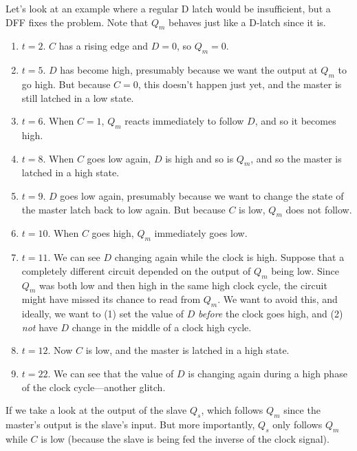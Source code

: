   \begin{example}
    \label{ex:waveforms-of-dff}
    Let's look at an example where a regular D latch would be insufficient, but a DFF fixes the problem. Note that $Q_m$ behaves just like a D-latch since it is.
    \begin{enumerate}
      \item $t = 2$. $C$ has a rising edge and $D = 0$, so $Q_m = 0$. 
      \item $t = 5$. $D$ has become high, presumably because we want the output at $Q_m$ to go high. But because $C = 0$, this doesn't happen just yet, and the master is still latched in a low state. 
      \item $t = 6$. When $C = 1$, $Q_m$ reacts immediately to follow $D$, and so it becomes high. 
      \item $t = 8$. When $C$ goes low again, $D$ is high and so is $Q_m$, and so the master is latched in a high state. 
      \item $t = 9$. $D$ goes low again, presumably because we want to change the state of the master latch back to low again. But because $C$ is low, $Q_m$ does not follow. 
      \item $t = 10$. When $C$ goes high, $Q_m$ immediately goes low. 
      \item $t = 11$. We can see $D$ changing again while the clock is high. Suppose that a completely different circuit depended on the output of $Q_m$ being low. Since $Q_m$ was both low and then high in the same high clock cycle, the circuit might have missed its chance to read from $Q_m$. We want to avoid this, and ideally, we want to (1) set the value of $D$ \textit{before} the clock goes high, and (2) \textit{not} have $D$ change in the middle of a clock high cycle. \item $t = 12$. Now $C$ is low, and the master is latched in a high state. 
      \item $t = 22$. We can see that the value of $D$ is changing again during a high phase of the clock cycle---another glitch. 
    \end{enumerate}
    If we take a look at the output of the slave $Q_s$, which follows $Q_m$ since the master's output is the slave's input. But more importantly, $Q_s$ only follows $Q_m$ while $C$ is low (because the slave is being fed the inverse of the clock signal). 


\end{example}
